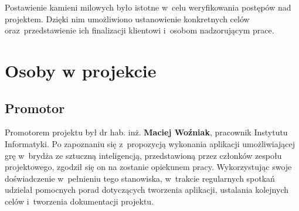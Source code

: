 Postawienie kamieni milowych było istotne w~celu weryfikowania postępów
nad projektem. Dzięki nim umożliwiono ustanowienie konkretnych celów oraz~przedstawienie
ich finalizacji klientowi i~osobom nadzorującym prace.



\section{Osoby w projekcie}

\subsection{Promotor}

Promotorem projektu był dr hab. inż. \textbf{Maciej Woźniak}, pracownik Instytutu Informatyki.
Po zapoznaniu się z~propozycją wykonania aplikacji umożliwiającej grę w~brydża ze sztuczną
inteligencją, przedstawioną przez członków zespołu projektowego, zgodził się on na zostanie
opiekunem pracy. Wykorzystując swoje doświadczenie w~pełnieniu tego stanowiska, w~trakcie regularnych
spotkań udzielał pomocnych porad dotyczących tworzenia aplikacji, ustalania kolejnych celów
i~tworzenia dokumentacji projektu.

